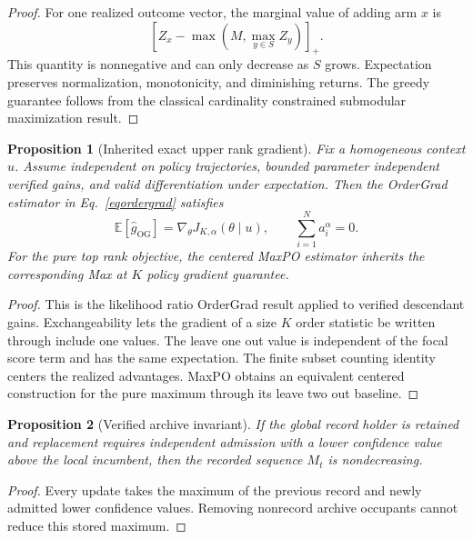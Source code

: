 \documentclass{article}
\newcommand{\pos}[1]{\left[#1\right]_{+}}
\newtheorem{proposition}{Proposition}
\begin{document}
\begin{proof}
For one realized outcome vector, the marginal value of adding arm $x$ is
\begin{equation*}
\pos{
Z_x-
\max\left(M,\max_{y\in S}Z_y\right)
}.
\end{equation*}
This quantity is nonnegative and can only decrease as $S$ grows. Expectation preserves normalization, monotonicity, and diminishing returns. The greedy guarantee follows from the classical cardinality constrained submodular maximization result.
\end{proof}

\begin{proposition}[Inherited exact upper rank gradient]
Fix a homogeneous context $u$. Assume independent on policy trajectories, bounded parameter independent verified gains, and valid differentiation under expectation. Then the OrderGrad estimator in Eq.~\eqref{eqordergrad} satisfies
\begin{equation*}
\mathbb E\!\left[\widehat g_{\mathrm{OG}}\right]
=
\nabla_{\theta}J_{K,\alpha}(\theta\mid u),
\qquad
\sum_{i=1}^{N}a_i^{\alpha}=0.
\end{equation*}
For the pure top rank objective, the centered MaxPO estimator inherits the corresponding Max at $K$ policy gradient guarantee.
\end{proposition}

\begin{proof}
This is the likelihood ratio OrderGrad result applied to verified descendant gains. Exchangeability lets the gradient of a size $K$ order statistic be written through include one values. The leave one out value is independent of the focal score term and has the same expectation. The finite subset counting identity centers the realized advantages. MaxPO obtains an equivalent centered construction for the pure maximum through its leave two out baseline.
\end{proof}

\begin{proposition}[Verified archive invariant]
If the global record holder is retained and replacement requires independent admission with a lower confidence value above the local incumbent, then the recorded sequence $M_t$ is nondecreasing.
\end{proposition}

\begin{proof}
Every update takes the maximum of the previous record and newly admitted lower confidence values. Removing nonrecord archive occupants cannot reduce this stored maximum.
\end{proof}
\end{document}
